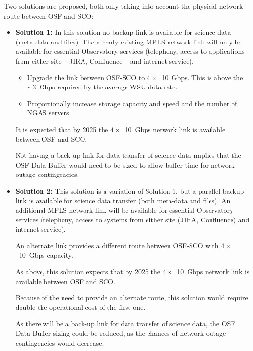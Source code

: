 Two solutions are proposed, both only taking into account the physical network route between OSF and SCO:

\begin{itemize}[itemsep=-0.5em]
	\item \textbf{Solution 1:} In this solution no backup link is available for science data (meta-data and files). The already existing MPLS network link will only be available for essential Observatory services (telephony, access to applications from either site -- JIRA, Confluence -- and internet service).
	\begin{itemize}[itemsep=-0.5em]
		\item Upgrade the link between OSF-SCO to $4 \times$~10~Gbps. This is above the $\sim 3$~Gbps required by the average WSU data rate.
		\item Proportionally increase storage capacity and speed and the number of NGAS servers.
	\end{itemize}

It is expected that by 2025 the $4 \times$~10~Gbps network link is available between OSF and SCO.
	
Not having a back-up link for data transfer of science data implies that the OSF Data Buffer would need to be sized to allow buffer time for network outage contingencies.
	
	\item \textbf{Solution 2:} This solution is a variation of Solution 1, but a parallel backup link is available for science data transfer (both meta-data and files). An additional MPLS network link will be available for essential Observatory services (telephony, access to systems from either site (JIRA, Confluence) and internet service).

	An alternate link provides a different route between OSF-SCO with $4 \times$~10~Gbps capacity.
	
	As above, this solution expects that by 2025 the $4 \times$~10~Gbps network link is available between OSF and SCO.
	
	Because of the need to provide an alternate route, this solution would require double the operational cost of the first one.
	
	As there will be a back-up link for data transfer of science data, the OSF Data Buffer sizing could be reduced, as the chances of network outage contingencies would decrease.
\end{itemize}

